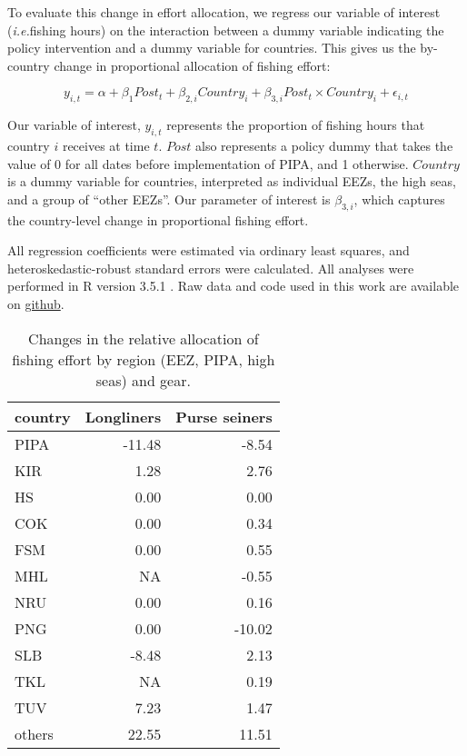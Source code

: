 \documentclass[12pt,]{article}
\begin{document}
To evaluate this change in effort allocation, we regress our variable of
interest (\emph{i.e.}fishing hours) on the interaction between a dummy
variable indicating the policy intervention and a dummy variable for
countries. This gives us the by-country change in proportional
allocation of fishing effort:

\[
y_{i,t} = \alpha + \beta_1Post_t + \beta_{2,i}Country_i + \beta_{3,i}Post_t \times Country_i + \epsilon_{i,t}
\]

Our variable of interest, \(y_{i,t}\) represents the proportion of
fishing hours that country \(i\) receives at time \(t\). \(Post\) also
represents a policy dummy that takes the value of 0 for all dates before
implementation of PIPA, and 1 otherwise. \(Country\) is a dummy variable
for countries, interpreted as individual EEZs, the high seas, and a
group of ``other EEZs''. Our parameter of interest is \(\beta_{3,i}\),
which captures the country-level change in proportional fishing effort.

All regression coefficients were estimated via ordinary least squares,
and heteroskedastic-robust standard errors were calculated. All analyses
were performed in R version 3.5.1 \citep{rcore_2018}. Raw data and code
used in this work are available on
\href{https://github.com/jcvdav/MPA_displacement}{github}.

\begin{table}[H]

\caption{\label{tab:unnamed-chunk-8}\label{tab:ba_disp}Changes in the relative allocation of fishing effort by region (EEZ, PIPA, high seas) and gear.}
\centering
\begin{tabular}[t]{lrr}
\toprule
country & Longliners & Purse seiners\\
\midrule
PIPA & -11.48 & -8.54\\
KIR & 1.28 & 2.76\\
HS & 0.00 & 0.00\\
COK & 0.00 & 0.34\\
FSM & 0.00 & 0.55\\
\addlinespace
MHL & NA & -0.55\\
NRU & 0.00 & 0.16\\
PNG & 0.00 & -10.02\\
SLB & -8.48 & 2.13\\
TKL & NA & 0.19\\
\addlinespace
TUV & 7.23 & 1.47\\
others & 22.55 & 11.51\\
\bottomrule
\end{tabular}
\end{table}
\end{document}
